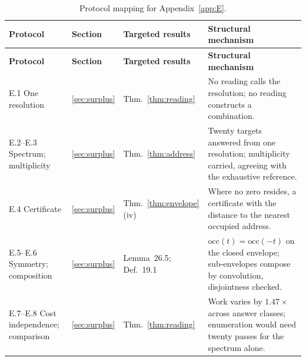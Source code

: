 \documentclass[pdflatex,sn-mathphys-num]{sn-jnl}
\theoremstyle{thmstyleone}%
\theoremstyle{thmstyletwo}%
\theoremstyle{thmstylethree}%
\begin{document}
\begin{appendices}
\begingroup\small\renewcommand{\arraystretch}{1.3}
\begin{longtable}{@{} p{} p{} p{} p{} @{}}
\caption{Protocol mapping for Appendix~\ref{app:E}.}\label{tab:appE_mapping}\\
\toprule
\textbf{Protocol} & \textbf{Section} & \textbf{Targeted results} & \textbf{Structural mechanism} \\
\midrule
\endfirsthead
\toprule
\textbf{Protocol} & \textbf{Section} & \textbf{Targeted results} & \textbf{Structural mechanism} \\
\midrule
\endhead
\bottomrule
\endfoot
E.1 One resolution & \ref{sec:surplus} & Thm.~\ref{thm:reading} & No reading calls the resolution; no reading constructs a combination. \\
E.2--E.3 Spectrum; multiplicity & \ref{sec:surplus} & Thm.~\ref{thm:address} & Twenty targets answered from one resolution; multiplicity carried, agreeing with the exhaustive reference. \\
E.4 Certificate & \ref{sec:surplus} & Thm.~\ref{thm:envelope}(iv) & Where no zero resides, a certificate with the distance to the nearest occupied address. \\
E.5--E.6 Symmetry; composition & \ref{sec:surplus} & Lemma~26.5; Def.~19.1 & $\mathrm{occ}(t)=\mathrm{occ}(-t)$ on the closed envelope; sub-envelopes compose by convolution, disjointness checked. \\
E.7--E.8 Cost independence; comparison & \ref{sec:surplus} & Thm.~\ref{thm:reading} & Work varies by $1.47\times$ across answer classes; enumeration would need twenty passes for the spectrum alone. \\
\end{longtable}\endgroup


\end{appendices}
\end{document}
